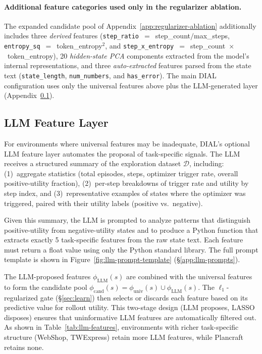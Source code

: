 \paragraph{Additional feature categories used only in the
regularizer ablation.} The expanded candidate pool of
Appendix~\ref{app:regularizer-ablation} additionally includes
three \emph{derived} features (\texttt{step\_ratio}~$=$~step\_count$/$max\_steps,
\texttt{entropy\_sq}~$=$~token\_entropy$^{2}$, and
\texttt{step\_x\_entropy}~$=$~step\_count~$\times$~token\_entropy),
20 \emph{hidden-state PCA} components extracted from the model's
internal representations, and three \emph{auto-extracted}
features parsed from the state text (\texttt{state\_length},
\texttt{num\_numbers}, and \texttt{has\_error}). The main DIAL
configuration uses only the universal features above plus the
LLM-generated layer (Appendix~\ref{app:llm-feature-layer}).

\subsection{LLM Feature Layer}
\label{app:llm-feature-layer}

For environments where universal features may be inadequate,
DIAL's optional LLM feature layer automates the proposal of
task-specific signals. The LLM receives a structured summary of
the exploration dataset $\mathcal{D}$, including: (1)~aggregate
statistics (total episodes, steps, optimizer trigger rate, overall
positive-utility fraction), (2)~per-step breakdowns of trigger
rate and utility by step index, and (3)~representative examples
of states where the optimizer was triggered, paired with their
utility labels (positive vs.\ negative).

Given this summary, the LLM is prompted to analyze patterns that
distinguish positive-utility from negative-utility states and to
produce a Python function that extracts exactly 5 task-specific
features from the raw state text. Each feature must return a
float value using only the Python standard library. The full
prompt template is shown in Figure~\ref{fig:llm-prompt-template}
(\S\ref{app:llm-prompts}).

The LLM-proposed features $\phi_{\text{LLM}}(s)$ are combined
with the universal features to form the candidate pool
$\phi_{\text{cand}}(s) = \phi_{\text{univ}}(s) \cup
\phi_{\text{LLM}}(s)$. The $\ell_1$-regularized gate
(\S\ref{sec:learn}) then selects or discards each feature based
on its predictive value for rollout utility. This two-stage
design (LLM proposes, LASSO disposes) ensures that uninformative
LLM features are automatically filtered out. As shown in
Table~\ref{tab:llm-features}, environments with richer
task-specific structure (WebShop, TWExpress) retain more LLM
features, while Plancraft retains none.

